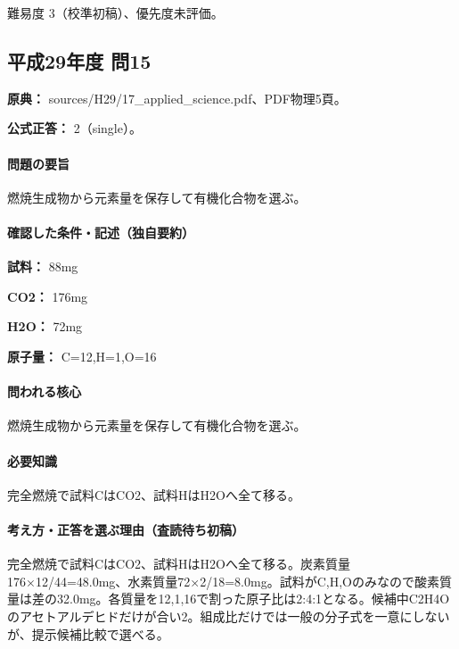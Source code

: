 \par 難易度 3（校準初稿）、優先度未評価。

\subsection{平成29年度 問15}
\label{q:h29-reg-applied-15}

\noindent\textbf{原典：} sources/H29/17\_applied\_science.pdf、PDF物理5頁。

\textbf{公式正答：} 2（single）。

\paragraph{問題の要旨} 燃焼生成物から元素量を保存して有機化合物を選ぶ。

\paragraph{確認した条件・記述（独自要約）}\mbox{}\par

\noindent\textbf{試料：} 88mg\par

\noindent\textbf{CO2：} 176mg\par

\noindent\textbf{H2O：} 72mg\par

\noindent\textbf{原子量：} C=\allowbreak{}12,H=\allowbreak{}1,O=\allowbreak{}16\par

\paragraph{問われる核心} 燃焼生成物から元素量を保存して有機化合物を選ぶ。

\paragraph{必要知識} 完全燃焼で試料CはCO2、試料HはH2Oへ全て移る。

\paragraph{考え方・正答を選ぶ理由（査読待ち初稿）} 完全燃焼で試料CはCO2、試料HはH2Oへ全て移る。炭素質量176×12/44=\allowbreak{}48.0mg、水素質量72×2/18=\allowbreak{}8.0mg。試料がC,H,Oのみなので酸素質量は差の32.0mg。各質量を12,1,16で割った原子比は2:4:1となる。候補中C2H4Oのアセトアルデヒドだけが合い2。組成比だけでは一般の分子式を一意にしないが、提示候補比較で選べる。

